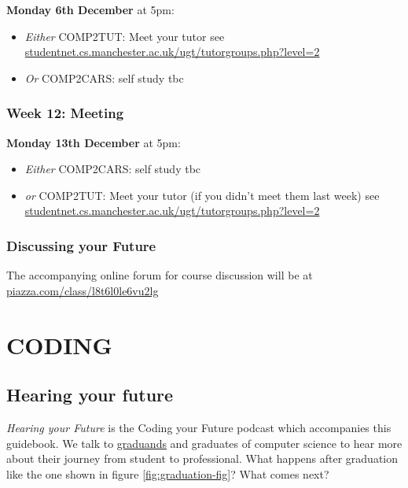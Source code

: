 \documentclass[
]{book}
\providecommand{\tightlist}{%
  \setlength{\itemsep}{0pt}\setlength{\parskip}{0pt}}
\begin{document}
\textbf{Monday 6th December} at 5pm:

\begin{itemize}
\tightlist
\item
  \emph{Either} COMP2TUT: Meet your tutor see \href{http://studentnet.cs.manchester.ac.uk/ugt/tutorgroups.php?level=2}{studentnet.cs.manchester.ac.uk/ugt/tutorgroups.php?level=2}
\item
  \emph{Or} COMP2CARS: self study tbc
\end{itemize}

\hypertarget{week12}{%
\section{Week 12: Meeting}\label{week12}}

\textbf{Monday 13th December} at 5pm:

\begin{itemize}
\tightlist
\item
  \emph{Either} COMP2CARS: self study tbc
\item
  \emph{or} COMP2TUT: Meet your tutor (if you didn't meet them last week) see \href{http://studentnet.cs.manchester.ac.uk/ugt/tutorgroups.php?level=2}{studentnet.cs.manchester.ac.uk/ugt/tutorgroups.php?level=2}
\end{itemize}

\hypertarget{discussing-your-future}{%
\section{Discussing your Future}\label{discussing-your-future}}

The accompanying online forum for course discussion will be at \href{https://piazza.com/class/l8t6l0le6vu2lg}{piazza.com/class/l8t6l0le6vu2lg}

\hypertarget{part-coding}{%
\part{CODING}\label{part-coding}}

\hypertarget{hearing}{%
\chapter{Hearing your future}\label{hearing}}

\emph{Hearing your Future} is the Coding your Future podcast which accompanies this guidebook. We talk to \href{https://en.wiktionary.org/wiki/graduand}{graduands} and graduates of computer science to hear more about their journey from student to professional. What happens after graduation like the one shown in figure \ref{fig:graduation-fig}? What comes next?
\end{document}
